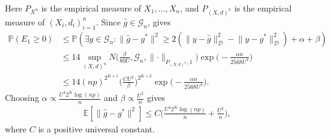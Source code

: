 \documentclass[10pt]{article}
\def\E{\mathbb{E}}
\def\P{\mathbb{P}}
\def\G{\mathcal{G}}
\def\dataD{\mathcal{D}}
\theoremstyle{definition}
\theoremstyle{remark}
\begin{document}
Here $P_{X^n}$ is the empirical measure of $X_1,\ldots,X_n$, and
$P_{(X,d)^n}$ is the empirical measure of $(X_i,d_i)_{i=1}^n$. Since
$\hat{g} \in \G_n$, \cite[Theorem 11.4]{Gyorfi-etal_2002_book} gives
\begin{align*}
    \P(E_1 \geq 0) & \leq \P(\exists g \in \G_n: \lVert \hat{g} - g^{\ast}\rVert^2 \geq 2 (\lVert y - \hat{g} \rVert_{\dataD}^2 - \lVert y - g^{\ast}\rVert_{\dataD}^2) + \alpha + \beta) \\
    & \leq 14 \sup_{(X,d)^n} N \bigg(\frac{\beta}{80 U}, \G_n, \lVert \cdot \rVert_{P_{(X,d)^n}, 1} \bigg) \exp \bigg(- \frac{\alpha n}{2568 U^4}\bigg) \\
    & \leq 14 (n p)^{2^{K+1}} \bigg(\frac{C U^2}{\beta}\bigg)^{2^{K+2}} \exp \bigg(- \frac{\alpha n}{2568 U^4}\bigg).
\end{align*}
Choosing $\alpha \propto \frac{U^4 2^K \log(np)}{n}$ and $\beta \propto \frac{U^2}{n}$ gives
\begin{align*}
    \E[ \lVert \hat{g} - g^{\ast}\rVert^2] \leq C \bigg(\frac{U^4 2^K \log(np)}{n} + \frac{U^2}{n} \bigg),
\end{align*}
where $C$ is a positive universal constant.
\end{document}
